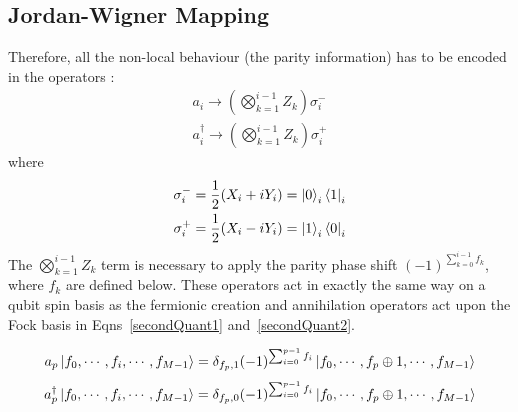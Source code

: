 \chapter{}
\label{section:fermion_preliminaries}
 

\section{Jordan-Wigner Mapping}
\label{section:jordan-wigner}
 Therefore, all the non-local behaviour (the parity information) has to be encoded in the operators \cite{chiew2021optimal}:
\begin{align}
        a_i \rightarrow \left( \bigotimes_{k=1}^{i-1} Z_k \right) \sigma_i^-\\
        a^{\dagger}_i \rightarrow \left( \bigotimes_{k=1}^{i-1} Z_k \right) \sigma_i^+
\end{align}
where
\begin{align}
        \sigma^-_i = \frac{1}{2} (X_i + i Y_i) = \ket{0}_i \bra{1}_i\\
        \sigma^+_i = \frac{1}{2} (X_i - i Y_i) = \ket{1}_i \bra{0}_i 
\end{align}
The $\bigotimes_{k=1}^{i-1} Z_k$ term is necessary to apply the parity phase shift $(-1)^{\sum_{k=0}^{i-1} f_k}$, where $f_k$ are defined below. These operators act in exactly the same way on a qubit spin basis as the fermionic creation and annihilation operators act upon the Fock basis in Eqns~\eqref{secondQuant1} and~\eqref{secondQuant2}.

\begin{equation}
    \label{secondQuant1}
    a_p \ket{f_0,\cdots, f_i, \cdots, f_{M-1}} = \delta_{f_p, 1} (-1)^{\sum_{i=0}^{p-1} f_i} \ket{f_0,\cdots, f_p \oplus 1, \cdots, f_{M-1}}
    \end{equation}
\begin{equation}
    \label{secondQuant2}
    a_p^{\dagger} \ket{f_0,\cdots, f_i, \cdots, f_{M-1}} = \delta_{f_p, 0} (-1)^{\sum_{i=0}^{p-1} f_i}
    \ket{f_0,\cdots, f_p \oplus 1, \cdots, f_{M-1}}
    \end{equation}
